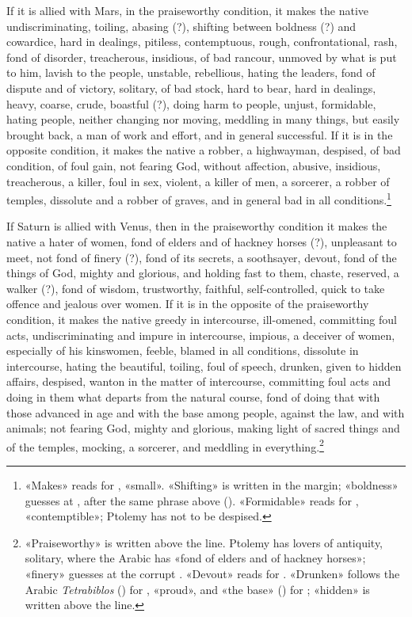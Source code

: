 \documentclass[11pt]{article}
\newcommand{\Fol}[1]{\marginpar{\footnotesize\color{gray}f.\,#1}}
\begin{document}
\par \Fol{57r}If it is allied with Mars, in the praiseworthy condition, it makes the native undiscriminating, toiling, abasing (?), shifting between boldness (?) and cowardice, hard in dealings, pitiless, contemptuous, rough, confrontational, rash, fond of disorder, treacherous, insidious, of bad rancour, unmoved by what is put to him, lavish to the people, unstable, rebellious, hating the leaders, fond of dispute and of victory, solitary, of bad stock, hard to bear, hard in dealings, heavy, coarse, crude, boastful (?), doing harm to people, unjust, formidable, hating people, neither changing nor moving, meddling in many things, but easily brought back, a man of work and effort, and in general successful. If it is in the opposite condition, it makes the native a robber, a highwayman, despised, of bad condition, of foul gain, not fearing God, without affection, abusive, insidious, treacherous, a killer, foul in sex, violent, a killer of men, a sorcerer, a robber of temples, dissolute and a robber of graves, and in general bad in all conditions.\footnote{«Makes» reads  for , «small». «Shifting» is written in the margin; «boldness» guesses at , after the same phrase above (). «Formidable» reads  for , «contemptible»; Ptolemy has not to be despised.}\par
\par If Saturn is allied with Venus, then in the praiseworthy condition it makes the native a hater of women, fond of elders and of hackney horses (?), unpleasant to meet, not fond of finery (?), fond of its secrets, a soothsayer, devout, fond of the things of God, mighty and glorious, and holding fast to them, chaste, reserved, a walker (?), fond of wisdom, trustworthy, faithful, self-controlled, quick to take offence and jealous over women. If it is in the opposite of the praiseworthy condition, it makes the native greedy in intercourse, ill-omened, committing foul acts, undiscriminating and impure in intercourse, impious, a deceiver of women, especially of his kinswomen, feeble, blamed in all conditions, dissolute in intercourse, hating the beautiful, toiling, foul of speech, drunken, given to hidden affairs, despised, wanton in the matter of intercourse, committing foul acts and doing in them what departs from the natural course, fond of doing that with those advanced in age and with the base among people, against the law, and with animals; not fearing God, mighty and glorious, making light of sacred things and of the temples, mocking, a sorcerer, and meddling in everything.\footnote{«Praiseworthy» is written above the line. Ptolemy has lovers of antiquity, solitary, where the Arabic has «fond of elders and of hackney horses»; «finery» guesses at the corrupt . «Devout» reads  for . «Drunken» follows the Arabic \emph{Tetrabiblos} () for , «proud», and «the base» () for ; «hidden» is written above the line.}\par
\end{document}
